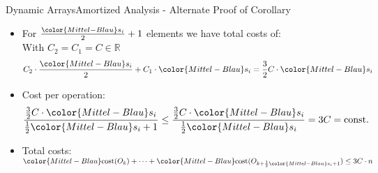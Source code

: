 \begin{frame}{Dynamic Arrays}{Amortized Analysis - Alternate Proof of Corollary}
  \begin{itemize}
    \item
      For $\frac{\color{Mittel-Blau}s_i}{2} + 1$ elements we have total
      {\color{Mittel-Blau}costs} of:\\
      \hspace{1.5em}With $C_2 = C_1 = C \in \mathbb{R}$
      \begin{displaymath}
        C_2 \cdot \frac{\color{Mittel-Blau}s_i}{2}
        + C_1 \cdot {\color{Mittel-Blau}s_i}
        = \frac{3}{2} C \cdot {\color{Mittel-Blau}s_i}
      \end{displaymath}
    \item
      Cost per operation:
      \begin{displaymath}
        \frac{
          \frac{3}{2} C \cdot {\color{Mittel-Blau}s_i}
        }{
          \frac{1}{2}{\color{Mittel-Blau}s_i} + 1
        }
        \leq
        \frac{
          \frac{3}{2} C \cdot {\color{Mittel-Blau}s_i}
        }{
          \frac{1}{2}{\color{Mittel-Blau}s_i}
        }
        = 3 C = \text{const.}
      \end{displaymath}
    \item
      Total costs:
      \begin{math}
        {\color{Mittel-Blau}\mathrm{cost}(O_k)}+\dots+
        {\color{Mittel-Blau}
          \mathrm{cost}(O_{k+\frac{1}{2}{\color{Mittel-Blau}s_i} + 1})}
        \leq 3C \cdot n
      \end{math}
  \end{itemize}
\end{frame}


